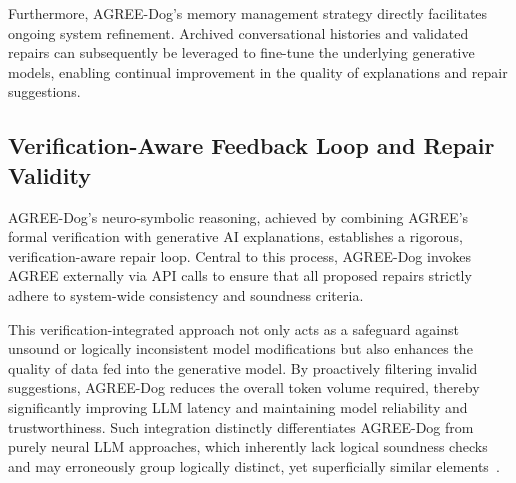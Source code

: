 Furthermore, AGREE-Dog’s memory management strategy directly facilitates ongoing system refinement. Archived conversational histories and validated repairs can subsequently be leveraged to fine-tune the underlying generative models, enabling continual improvement in the quality of explanations and repair suggestions.


%


%

\subsection{Verification-Aware Feedback Loop and Repair Validity}

AGREE-Dog’s neuro-symbolic reasoning, achieved by combining AGREE's formal verification with generative AI explanations, establishes a rigorous, verification-aware repair loop. Central to this process, AGREE-Dog invokes AGREE externally via API calls to ensure that all proposed repairs strictly adhere to system-wide consistency and soundness criteria.

This verification-integrated approach not only acts as a safeguard against unsound or logically inconsistent model modifications but also enhances the quality of data fed into the generative model. By proactively filtering invalid suggestions, AGREE-Dog reduces the overall token volume required, thereby significantly improving LLM latency and maintaining model reliability and trustworthiness. Such integration distinctly differentiates AGREE-Dog from purely neural LLM approaches, which inherently lack logical soundness checks and may erroneously group logically distinct, yet superficially similar elements~\cite{CoqDog,CoqDogHCSS24,openai-tokens-guide, Ersa24, mirzadeh2025gsmsymbolic}.

